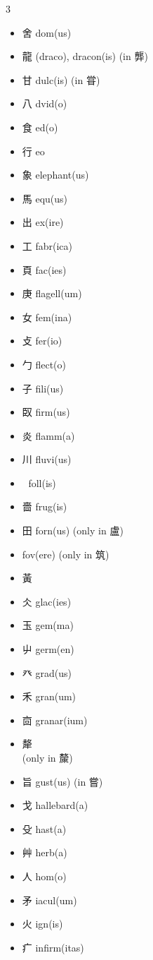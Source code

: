 \documentclass[xetex, svgnames, 12pt]{scrartcl}
\begin{document}
\begin{multicols}{3}
\begin{itemize}[noitemsep]
    \item 舍 dom(us) 
    \item 龍 (draco), dracon(is) (in 龏)
    \item 甘 dulc(is) (in 甞)
    \item 八 dvid(o)
    \item 食 ed(o) 
    \item 行 eo 
    \item 象 
    elephant(us) 
   \item 馬 equ(us)
   \item 出 ex(ire)
   \item 工 fabr(ica)
   \item 頁 fac(ies)
   \item 庚 flagell(um)
   \item 女 fem(ina) 
   \item 攴 fer(io) 
   \item 勹 flect(o)
   \item 子 fili(us) 
   \item 臤 firm(us)
   \item 炎 flamm(a)
   \item 川 fluvi(us)
   \item 𣒚 foll(is)
   \item 嗇 frug(is)
   \item 田 forn(us) (only in 盧)
   \item {} fov(ere) (only in 筑)
   \item 黃   
   \item 仌 glac(ies)    
   \item 玉 gem(ma)
   \item 屮 germ(en)
   \item 癶 grad(us)
   \item 禾 gran(um) 
   \item 㐭 granar(ium)
   \item 犛  \\ (only in 斄)
   \item 旨 gust(us) (in 嘗)
   \item 戈 hallebard(a) 
   \item 殳 hast(a)
   \item 艸 herb(a) 
   \item 人 hom(o) 
   \item 矛 iacul(um)
   \item 火 ign(is) 
   \item 疒 infirm(itas)

\end{itemize}
\end{multicols}
\end{document}
